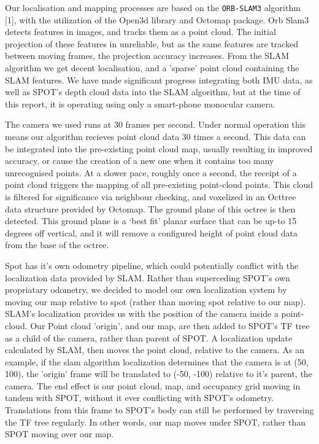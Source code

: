 \documentclass[10pt,english]{article}
\begin{document}
Our localisation and mapping processes are based on the \texttt{ORB-SLAM3} algorithm [1], with the utilization of the Open3d library and Octomap package. %
Orb Slam3 detects features in images, and tracks them as a point cloud. The initial projection of these features in unreliable, but as the same features are tracked between moving frames, the projection accuracy increases. From the SLAM algorithm we get decent localisation, and a 'sparse' point cloud containing the SLAM features. We have made significant progress integrating both IMU data, as well as SPOT's depth cloud data into the SLAM algorithm, but at the time of this report, it is operating using only a smart-phone monocular camera.

The camera we used runs at 30 frames per second. Under normal operation this means our algorithm recieves point cloud data 30 times a second. This data can be integrated into the pre-existing point cloud map, usually resulting in improved accuracy, or cause the creation of a new one when it contains too many unrecognised points. At a slower pace, roughly once a second, the receipt of a point cloud triggers the mapping of all pre-existing point-cloud points. This cloud is filtered for significance via neighbour checking, and voxelized in an Octtree data structure provided by Octomap. The ground plane of this octree is then detected. This ground plane is a `best fit' planar surface that can be up-to 15 degrees off vertical, and it will remove a configured height of point cloud data from the base of the octree.

Spot has it's own odometry pipeline, which could potentially conflict with the localization data provided by SLAM. Rather than superceding SPOT's own propriatary odometry, we decided to model our own localization system by moving our map relative to spot (rather than moving spot relative to our map). SLAM's localization provides us with the position of the camera inside a point-cloud. Our Point cloud 'origin', and our map, are then added to SPOT's TF tree as a child of the camera, rather than parent of SPOT. A localization update calculated by SLAM, then moves the point cloud, relative to the camera. As an example, if the slam algorithm localization determines that the camera is at (50, 100), the 'origin' frame will be translated to (-50, -100) relative to it's parent, the camera. The end effect is our point cloud, map, and occupancy grid moving in tandem with SPOT, without it ever conflicting with SPOT's odometry. Translations from this frame to SPOT's body can still be performed by traversing the TF tree regularly. In other words, our map moves under SPOT, rather than SPOT moving over our map.
\end{document}
